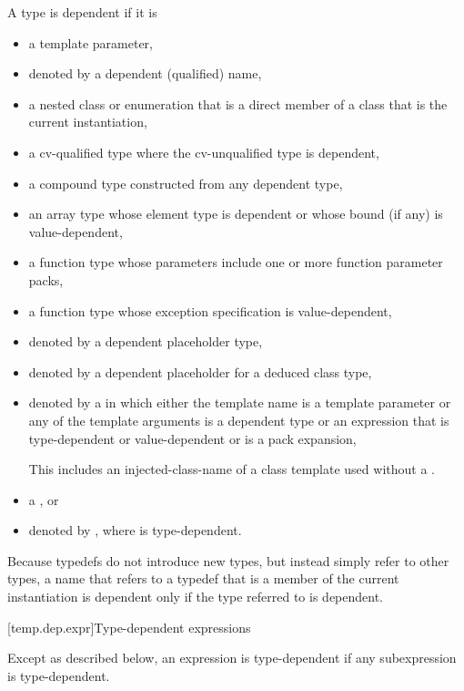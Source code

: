 \documentclass{wg21}
\begin{document}
\pnum
A type is dependent if it is
\begin{itemize}
\item
a template parameter,
\item
denoted by a dependent (qualified) name,
\item
a nested class or enumeration that is a direct member of
a class that is the current instantiation,
\item
a cv-qualified type where the cv-unqualified type is dependent,
\item
a compound type constructed from any dependent type,
\item
an array type whose element type is dependent or whose
bound (if any) is value-dependent,
\item
a function type whose parameters include one or more function parameter packs,
\item
a function type whose exception specification is value-dependent,
\item
denoted by a dependent placeholder type,
\item
denoted by a dependent placeholder for a deduced class type,
\item
denoted by a 
in which either the template name is a template parameter or any of the
template arguments is a dependent type or an expression that is type-dependent
or value-dependent or is a pack expansion,
\begin{wfootnote}
    This includes an injected-class-name of a class template
    used without a .
\end{wfootnote}
\item a , or
\item denoted by \tcode{)},
where  is type-dependent.
\end{itemize}

\pnum
\begin{note}
    Because typedefs do not introduce new types, but
    instead simply refer to other types, a name that refers to a
    typedef that is a member of the current instantiation is dependent
    only if the type referred to is dependent.
\end{note}

[temp.dep.expr]{Type-dependent expressions}

\pnum
Except as described below, an expression is type-dependent if any
subexpression is type-dependent.
\end{document}
